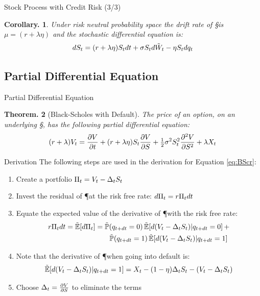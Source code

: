 \documentclass{beamer}
\newtheorem{thm}{Theorem.}
\newtheorem{cor}[thm]{Corollary.}
\begin{document}
\begin{frame}{Stock Process with Credit Risk (3/3)}
\begin{cor}
Under risk neutral probability space the drift rate of \S is $\mu = (r + \lambda\eta)$ and the stochastic differential equation is:
\begin{equation}
 dS_t = (r + \lambda\eta)S_tdt + \sigma S_td\tilde{W}_t - \eta S_tdq_t
\end{equation}
\end{cor}
\end{frame}


\subsection{Partial Differential Equation}

\begin{frame}{Partial Differential Equation}
\begin{thm}[Black-Scholes with Default]
The price of an option, on an underlying \S, has the following partial differential equation:
\begin{equation}
 (r + \lambda)V_t = \frac{\partial V}{\partial t} + (r + \lambda\eta)S_t\frac{\partial V}{\partial S} + \tfrac{1}{2}\sigma^2S_t^2\frac{\partial^2 V}{\partial S^2} + \lambda X_t \label{eq:BScr}
\end{equation}
\end{thm}
\end{frame}

\begin{frame}{Derivation}
The following steps are used in the derivation for Equation \ref{eq:BScr}:
\begin{enumerate}
 \item Create a portfolio $\Pi_t = V_t - \Delta_tS_t$
 \item Invest the residual of \P at the risk free rate: $d\Pi_t = r\Pi_tdt$
 \item Equate the expected value of the derivative of \P with the risk free rate:
       \begin{align}
        r\P\dt = \E[\dP] &= \Prob(\qdt = 0) \E[d(\V - \D\S)|\qdt = 0] + \n
                         &\qquad \Prob(\qdt = 1) \E[d(\V - \D\S)|\qdt = 1]
       \end{align}
 \item Note that the derivative of \P when going into default is:
       \begin{equation}
        \E[d(\V - \D\S)|\qdt = 1] = \X - (1 - \eta)\D\S -(\V - \D\S) \label{eq:dPx}
       \end{equation}
 \item Choose $\Delta_t = \frac{\partial V}{\partial S}$ to eliminate the \dW terms
\end{enumerate}
\end{frame}
\end{document}
